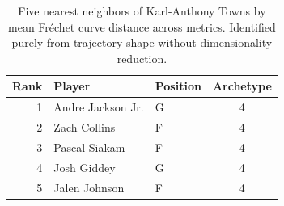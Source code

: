 \begin{table}[htbp]
  \centering\small
  \begin{tabular}{rllc}
    \toprule
    Rank & Player & Position & Archetype \\
    \midrule
    1 & Andre Jackson Jr. & G & 4 \\
    2 & Zach Collins & F & 4 \\
    3 & Pascal Siakam & F & 4 \\
    4 & Josh Giddey & G & 4 \\
    5 & Jalen Johnson & F & 4 \\
    \bottomrule
  \end{tabular}
  \caption{Five nearest neighbors of Karl-Anthony Towns by mean Fr\'{e}chet curve distance across metrics. Identified purely from trajectory shape without dimensionality reduction.}
  \label{tab:Karl_Anthony_Towns_frechet_curve_neighbors}
\end{table}


